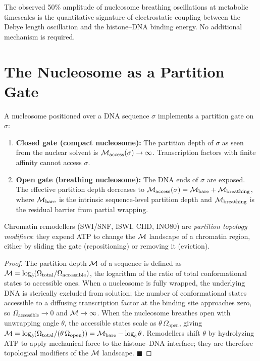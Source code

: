 \begin{keyresult}
The observed 50\% amplitude of nucleosome breathing oscillations at metabolic
timescales is the quantitative signature of electrostatic coupling between the
Debye length oscillation and the histone--DNA binding energy. No additional
mechanism is required.
\end{keyresult}

\section{The Nucleosome as a Partition Gate}
\label{sec:nucleosome_gate}

\begin{theorem}
\label{thm:nucleosome_gate}
A nucleosome positioned over a DNA sequence $\sigma$ implements a partition
gate on $\sigma$:
\begin{enumerate}[label=(\roman*)]
  \item \textbf{Closed gate (compact nucleosome):} The partition depth of
        $\sigma$ as seen from the nuclear solvent is
        $\mathcal{M}_{\mathrm{access}}(\sigma) \to \infty$. Transcription factors
        with finite affinity cannot access $\sigma$.
  \item \textbf{Open gate (breathing nucleosome):} The DNA ends of $\sigma$
        are exposed. The effective partition depth decreases to
        $\mathcal{M}_{\mathrm{access}}(\sigma) = \mathcal{M}_{\mathrm{bare}} +
        \mathcal{M}_{\mathrm{breathing}}$, where $\mathcal{M}_{\mathrm{bare}}$ is the
        intrinsic sequence-level partition depth and $\mathcal{M}_{\mathrm{breathing}}$
        is the residual barrier from partial wrapping.
\end{enumerate}
Chromatin remodellers (SWI/SNF, ISWI, CHD, INO80) are \emph{partition topology
modifiers}: they expend ATP to change the $\mathcal{M}$ landscape of a chromatin
region, either by sliding the gate (repositioning) or removing it (eviction).
\end{theorem}

\begin{proof}
The partition depth $\mathcal{M}$ of a sequence is defined as
$\mathcal{M} = \log_b(\Omega_{\mathrm{total}}/\Omega_{\mathrm{accessible}})$,
the logarithm of the ratio of total conformational states to accessible ones.
When a nucleosome is fully wrapped, the underlying DNA is sterically excluded
from solution; the number of conformational states accessible to a diffusing
transcription factor at the binding site approaches zero, so
$\Omega_{\mathrm{accessible}} \to 0$ and $\mathcal{M} \to \infty$. When the
nucleosome breathes open with unwrapping angle $\theta$, the accessible
states scale as $\theta\,\Omega_{\mathrm{open}}$, giving
$\mathcal{M} = \log_b(\Omega_{\mathrm{total}}/(\theta\,\Omega_{\mathrm{open}}))
= \mathcal{M}_{\mathrm{bare}} - \log_b\theta$.
Remodellers shift $\theta$ by hydrolyzing ATP to apply mechanical force to
the histone--DNA interface; they are therefore topological modifiers of the
$\mathcal{M}$ landscape. $\blacksquare$
\end{proof}

